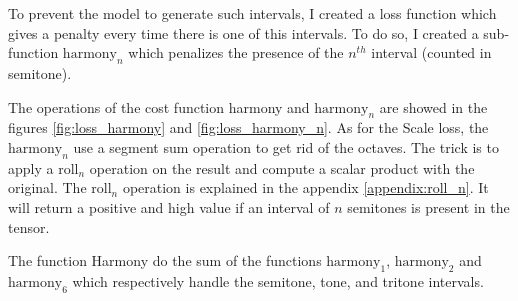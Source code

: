 \documentclass[12pt]{report}
\begin{document}
To prevent the model to generate such intervals, I created a loss function which gives a penalty every time there is one of this intervals.
To do so, I created a sub-function $\text{harmony}_n$ which penalizes the presence of the $n^{th}$ interval (counted in semitone).

The operations of the cost function harmony and $\text{harmony}_n$ are showed in the figures \ref{fig:loss_harmony} and \ref{fig:loss_harmony_n}.
As for the Scale loss, the $\text{harmony}_{n}$ use a segment sum operation to get rid of the octaves.
The trick is to apply a $\text{roll}_{n}$ operation on the result and compute a scalar product with the original.
The $\text{roll}_n$ operation is explained in the appendix \ref{appendix:roll_n}.
It will return a positive and high value if an interval of $n$ semitones is present in the tensor.

The function Harmony do the sum of the functions $\text{harmony}_1$, $\text{harmony}_{2}$ and $\text{harmony}_{6}$ which respectively handle the semitone, tone, and tritone intervals.
\end{document}
